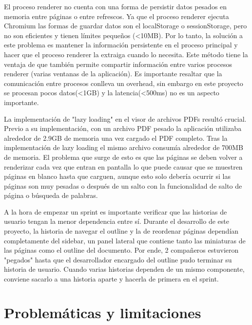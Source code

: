 
El proceso renderer no cuenta con una forma de persistir datos pesados en memoria entre páginas o entre refrescos. Ya que el proceso renderer ejecuta Chromium las formas de guardar datos son el localStorage o sessionStorage, pero no son eficientes y tienen límites pequeños (<10MB). Por lo tanto, la solución a este problema es mantener la información persistente en el proceso principal y hacer que el proceso renderer la extraiga cuando lo necesita. Este método tiene la ventaja de que también permite compartir información entre varios procesos renderer (varias ventanas de la aplicación). Es importante resaltar que la comunicación entre procesos conlleva un overhead, sin embargo en este proyecto se procesan pocos datos(<1GB) y la latencia(<500ms) no es un aspecto importante.


La implementación de "lazy loading" en el visor de archivos PDFs resultó crucial. Previo a su implementación, con un archivo PDF pesado la aplicación utilizaba alrededor de 2.9GB de memoria una vez cargado el PDF completo. Tras la implementación de lazy loading el mismo archivo consumía alrededor de 700MB de memoria. El problema que surge de esto es que las páginas se deben volver a renderizar cada vez que entran en pantalla lo que puede causar que se muestren páginas en blanco hasta que carguen, aunque esto solo debería ocurrir si las páginas son muy pesadas o después de un salto con la funcionalidad de salto de página o búsqueda de palabras.


A la hora de empezar un sprint es importante verificar que las historias de usuario tengan la menor dependencia entre sí. Durante el desarrollo de este proyecto, la historia de navegar el outline y la de reordenar páginas dependían completamente del sidebar, un panel lateral que contiene tanto las miniaturas de las páginas como el outline del documento. Por ende, 2 compañeros estuvieron "pegados" hasta que el desarrollador encargado del outline pudo terminar su historia de usuario. Cuando varias historias dependen de un mismo componente, conviene sacarlo a una historia aparte y hacerla de primera en el sprint.


\section{Problemáticas y limitaciones}

